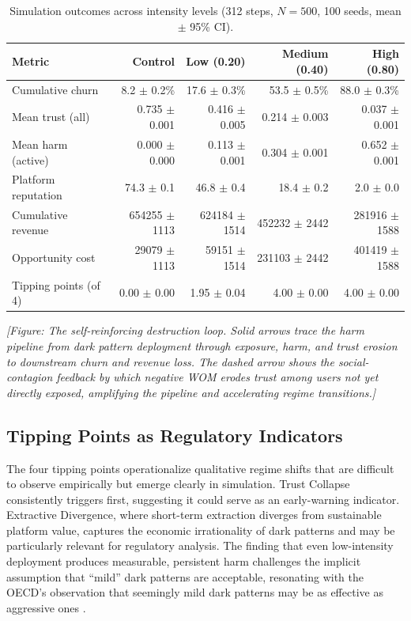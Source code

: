 \documentclass[a4paper]{article}
\begin{document}
\begin{table}[!t]
\centering
\caption{Simulation outcomes across intensity levels (312 steps, $N=500$, 100 seeds, mean $\pm$ 95\% CI).}
\label{tab:intensity}
\begin{tabular}{lrrrr}
\toprule
Metric & Control & Low (0.20) & Medium (0.40) & High (0.80) \\
\midrule
Cumulative churn & 8.2 $\pm$ 0.2\% & 17.6 $\pm$ 0.3\% & 53.5 $\pm$ 0.5\% & 88.0 $\pm$ 0.3\% \\
Mean trust (all) & 0.735 $\pm$ 0.001 & 0.416 $\pm$ 0.005 & 0.214 $\pm$ 0.003 & 0.037 $\pm$ 0.001 \\
Mean harm (active) & 0.000 $\pm$ 0.000 & 0.113 $\pm$ 0.001 & 0.304 $\pm$ 0.001 & 0.652 $\pm$ 0.001 \\
Platform reputation & 74.3 $\pm$ 0.1 & 46.8 $\pm$ 0.4 & 18.4 $\pm$ 0.2 & 2.0 $\pm$ 0.0 \\
Cumulative revenue & 654255 $\pm$ 1113 & 624184 $\pm$ 1514 & 452232 $\pm$ 2442 & 281916 $\pm$ 1588 \\
Opportunity cost & 29079 $\pm$ 1113 & 59151 $\pm$ 1514 & 231103 $\pm$ 2442 & 401419 $\pm$ 1588 \\
Tipping points (of 4) & 0.00 $\pm$ 0.00 & 1.95 $\pm$ 0.04 & 4.00 $\pm$ 0.00 & 4.00 $\pm$ 0.00 \\
\bottomrule
\end{tabular}
\end{table}



\textit{[Figure: The self-reinforcing destruction loop. Solid arrows trace the harm pipeline from dark pattern deployment through exposure, harm, and trust erosion to downstream churn and revenue loss. The dashed arrow shows the social-contagion feedback by which negative WOM erodes trust among users not yet directly exposed, amplifying the pipeline and accelerating regime transitions.]}


\subsection{Tipping Points as Regulatory Indicators}
The four tipping points operationalize qualitative regime shifts that are difficult to observe empirically but emerge clearly in simulation. Trust Collapse consistently triggers first, suggesting it could serve as an early-warning indicator. Extractive Divergence, where short-term extraction diverges from sustainable platform value, captures the economic irrationality of dark patterns and may be particularly relevant for regulatory analysis. The finding that even low-intensity deployment produces measurable, persistent harm challenges the implicit assumption that ``mild'' dark patterns are acceptable, resonating with the OECD's observation that seemingly mild dark patterns may be as effective as aggressive ones \citep{oecd2022}.
\end{document}
